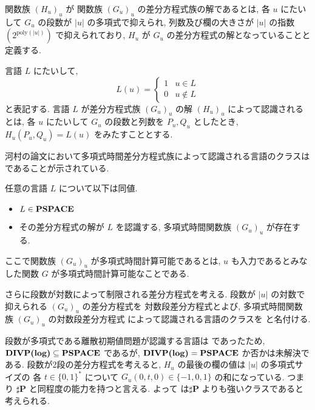  関数族 $(H_u)_u$ が 関数族 $(G_u)_u$ の差分方程式族の解であるとは,
 各 $u$ にたいして $G_u$ の段数が $|u|$ の多項式で抑えられ, 
 列数及び欄の大きさが $|u|$ の指数$(2^{\mathrm{poly} (|u|)})$ で抑えられており,
 $H_u$ が $G_u$ の差分方程式の解となっていることと定義する.

 言語 $L$ にたいして, 
 \begin{equation}
	L(u) = \begin{cases} 
	       1 & u \in L \\
	       0 & u \not \in L 
	       \end{cases}
 \end{equation}
 と表記する.
 言語 $L$ が差分方程式族 $(G_u)_u$ の解 $(H_u)_u$ によって認識されるとは,
 各 $u$ にたいして $G_u$ の段数と列数を $P_u, Q_u$ としたとき,
 $H_u(P_u, Q_u) = L(u)$ をみたすこととする.



 河村の論文において多項式時間差分方程式族によって認識される言語のクラスは
 \PSPACE であることが示されている.

 \begin{lemma}
  \label{WeakFeedback}
  任意の言語 $L$ について以下は同値.
  \begin{itemize}
   \item  $L \in  {\bf PSPACE}$
   \item その差分方程式の解が $L$ を認識する,
	 多項式時間関数族 $(G_u)_u$ が存在する.
  \end{itemize}
 \end{lemma}

 ここで関数族 $(G_u)_u$ が多項式時間計算可能であるとは,
 $u$ も入力であるとみなした関数 $G$ が多項式時間計算可能なことである.



 さらに段数が対数によって制限される差分方程式を考える.
 段数が $|u|$ の対数で抑えられる $(G_u)_u$ の差分方程式を
 対数段差分方程式とよび, 多項式時間関数族 $(G_u)_u$ の対数段差分方程式
 によって認識される言語のクラスを \DIVPlog と名付ける.
 
 段数が多項式である離散初期値問題が認識する言語は \PSPACE であったため,
 $\text{\bf DIVP(log)} \subseteq {\bf PSPACE}$ であるが, $\text{\bf DIVP(log)} = {\bf PSPACE}$ か否かは未解決である.
 段数が2段の差分方程式を考えると,
 $H_u$ の最後の欄の値は
 $|u|$ の多項式サイズの 各 $t \in \{0,1\}^*$ について
 $G_u(0, t, 0) \in \{-1, 0, 1\}$ の和になっている.
 つまり $\sharp${\bf P} と同程度の能力を持つと言える.
 よって \DIVPlog は$\sharp${\bf P} よりも強いクラスであると考えられる.

